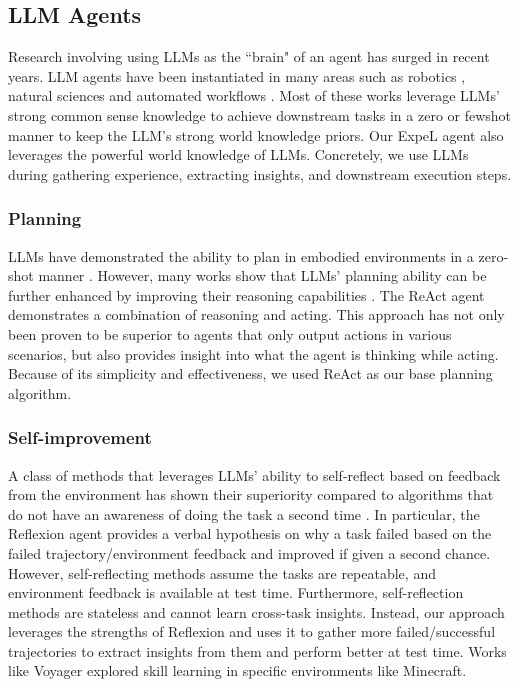 \documentclass[letterpaper]{article} %
\begin{document}
\subsection{LLM Agents}
\label{sec:llm_agents}
Research involving using LLMs as the ``brain" of an agent has surged in recent years. LLM agents have been instantiated in many areas such as robotics \cite{ha2023scaling,rt22023arxiv,mu2023embodiedgpt,mirchandani2023large,wu2023tidybot}, natural sciences \cite{bran2023chemcrow,boiko2023emergent} and automated workflows \cite{yang2023mm,gur2023real}. Most of these works leverage LLMs' strong common sense knowledge to achieve downstream tasks in a zero or fewshot manner to keep the LLM's strong world knowledge priors. Our ExpeL agent also leverages the powerful world knowledge of LLMs. Concretely, we use LLMs during gathering experience, extracting insights, and downstream execution steps.

\subsubsection{Planning}
\label{sec:planning}
LLMs have demonstrated the ability to plan in embodied environments in a zero-shot manner \cite{huang2022language}. However, many works show that LLMs' planning ability can be further enhanced by improving their reasoning capabilities \cite{yao2023tree,wei2022chain}. The ReAct agent \cite{yao2022react} demonstrates a combination of reasoning and acting. This approach has not only been proven to be superior to agents that only output actions in various scenarios, but also provides insight into what the agent is thinking while acting. Because of its simplicity and effectiveness, we used ReAct as our base planning algorithm.

\subsubsection{Self-improvement}
\label{sec:self-improvment}
A class of methods that leverages LLMs' ability to self-reflect based on feedback from the environment has shown their superiority compared to algorithms that do not have an awareness of doing the task a second time \cite{shinn2023reflexion,liu2023reflect}. In particular, the Reflexion agent \cite{shinn2023reflexion} provides a verbal hypothesis on why a task failed based on the failed trajectory/environment feedback and improved if given a second chance. However, self-reflecting methods assume the tasks are repeatable, and environment feedback is available at test time. Furthermore, self-reflection methods are stateless and cannot learn cross-task insights. Instead, our approach leverages the strengths of Reflexion and uses it to gather more failed/successful trajectories to extract insights from them and perform better at test time. Works like Voyager \cite{wang2023voyager} explored skill learning in specific environments like Minecraft.
\end{document}
